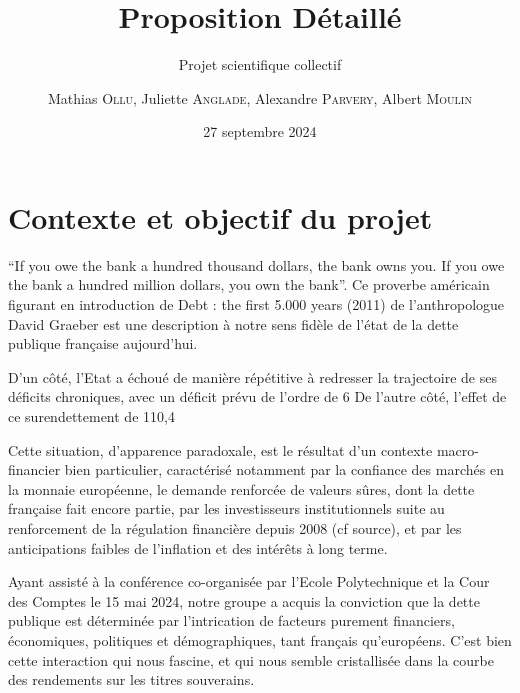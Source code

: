 \documentclass[a4paper]{article}
\author{Mathias \textsc{Ollu}, Juliette \textsc{Anglade}, Alexandre \textsc{Parvery}, Albert \textsc{Moulin}}
\date{27 septembre 2024}
\title{Proposition Détaillé}
\subtitle{
Projet scientifique collectif
}
\begin{document}
\maketitle 
\vfill
\Large
\tableofcontents
\newpage


\section{Contexte et objectif du projet}



“If you owe the bank a hundred thousand dollars, the bank owns you. If you owe the bank a hundred million dollars, you own the bank”. Ce proverbe américain figurant en introduction de Debt : the first 5.000 years (2011) de l’anthropologue David Graeber est une description à notre sens fidèle de l’état de la dette publique française aujourd’hui. 

D’un côté, l’Etat a échoué de manière répétitive à redresser la trajectoire de ses déficits chroniques, avec un déficit prévu de l’ordre de 6%
De l’autre côté, l’effet de ce surendettement de 110,4%

Cette situation, d’apparence paradoxale, est le résultat d’un contexte macro-financier bien particulier, caractérisé notamment par la confiance des marchés en la monnaie européenne, le demande renforcée de valeurs sûres, dont la dette française fait encore partie, par les investisseurs institutionnels suite au renforcement de la régulation financière depuis 2008 (cf source), et par les anticipations faibles de l’inflation et des intérêts à long terme. 

Ayant assisté à la conférence co-organisée par l’Ecole Polytechnique et la Cour des Comptes le 15 mai 2024, notre groupe a acquis la conviction que la dette publique est déterminée par l’intrication de facteurs purement financiers, économiques, politiques et démographiques, tant français qu’européens. C’est bien cette interaction qui nous fascine, et qui nous semble cristallisée dans la courbe des rendements sur les titres souverains.
\end{document}
